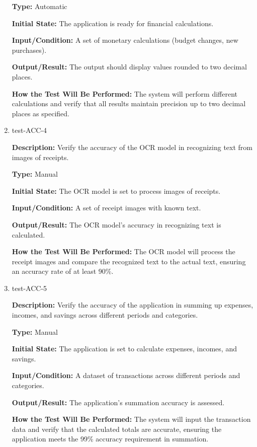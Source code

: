 \documentclass[12pt, titlepage]{article}
\begin{document}
\begin{enumerate}
\textbf{Type:} Automatic
					
\textbf{Initial State:} The application is ready for financial calculations.
					
\textbf{Input/Condition:} A set of monetary calculations (budget changes, new
purchases).
					
\textbf{Output/Result:} The output should display values rounded to two decimal
places.
					
\textbf{How the Test Will Be Performed:} The system will perform different
calculations and verify that all results maintain precision up to two decimal
places as specified.

\item{test-ACC-4\\}

\textbf{Description:} Verify the accuracy of the OCR model in recognizing text
from images of receipts.

\textbf{Type:} Manual
					
\textbf{Initial State:} The OCR model is set to process images of receipts.
					
\textbf{Input/Condition:} A set of receipt images with known text.
					
\textbf{Output/Result:} The OCR model's accuracy in recognizing text is
calculated.
					
\textbf{How the Test Will Be Performed:} The OCR model will process the receipt
images and compare the recognized text to the actual text, ensuring an accuracy
rate of at least 90\%.

\item{test-ACC-5\\}

\textbf{Description:} Verify the accuracy of the application in summing up
expenses, incomes, and savings across different periods and categories.

\textbf{Type:} Manual
					
\textbf{Initial State:} The application is set to calculate expenses, incomes,
and savings.
					
\textbf{Input/Condition:} A dataset of transactions across different periods and
categories.
					
\textbf{Output/Result:} The application's summation accuracy is assessed.
					
\textbf{How the Test Will Be Performed:} The system will input the transaction
data and verify that the calculated totals are accurate, ensuring the
application meets the 99\% accuracy requirement in summation.


\end{enumerate}
\end{document}
